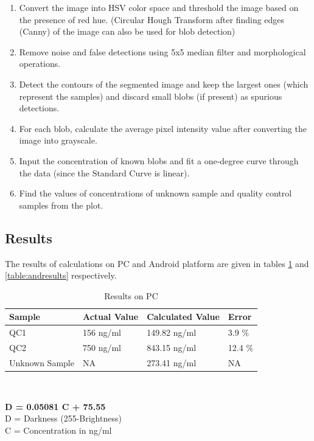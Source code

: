 \documentclass[runningheads,a4paper]{llncs}
\begin{document}
\begin{enumerate}

\item Convert the image into HSV color space and threshold the image based on the presence of red hue. (Circular Hough Transform after finding edges (Canny) of the image can also be used for blob detection)
\item Remove noise and false detections using 5x5 median filter and morphological operations.
\item Detect the contours of the segmented image and keep the largest ones (which represent the samples) and discard small blobs (if present) as spurious detections.
\item For each blob, calculate the average pixel intensity value after converting the image into grayscale.
\item Input the concentration of known blobs and fit a one-degree curve through the data (since the Standard Curve is linear).
\item Find the values of concentrations of unknown sample and quality control samples from the plot.
\end{enumerate}
\subsection{Results}

The results of calculations on PC and Android platform are given in tables \ref{table:pcresults} and \ref{table:andresults} respectively.

\begin{table}
\begin{center}
\setlength\tabcolsep{2.5pt}
\def\arraystretch{1.5}
\begin{tabular}{| m{5em} m{7em} m{9em} m{5em} |}
\hline
Sample & Actual Value & Calculated Value & Error\\
\hline
\hline
QC1 & 156 ng/ml & 149.82 ng/ml & 3.9 \%\\
\hline
QC2 & 750 ng/ml & 843.15 ng/ml & 12.4 \%\\
\hline
Unknown Sample & NA & 273.41 ng/ml & NA \\
\hline
\end{tabular}
\\
\caption{Results on PC}
\label{table:pcresults}
\textbf{ D = 0.05081 C + 75.55\\}
D = Darkness (255-Brightness) \\ C = Concentration in ng/ml
\end{center}
\end{table}
\end{document}
